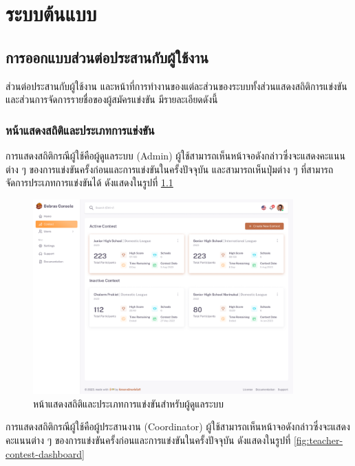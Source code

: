 \chapter{ระบบต้นแบบ}
\label{chapter:result}

\section{การออกแบบส่วนต่อประสานกับผู้ใช้งาน}

ส่วนต่อประสานกับผู้ใช้งาน และหน้าที่การทำงานของแต่ละส่วนของระบบทั้งส่วนแสดงสถิติการแข่งขันและส่วนการจัดการรายชื่อของผู้สมัครแข่งขัน มีรายละเอียดดังนี้

\subsection{หน้าแสดงสถิติและประเภทการแข่งขัน}

การแสดงสถิติกรณีผู้ใช้คือผู้ดูแลระบบ (Admin) ผู้ใช้สามารถเห็นหน้าจอดังกล่าวซึ่งจะแสดงคะแนนต่าง ๆ ของการแข่งขันครั้งก่อนและการแข่งขันในครั้งปัจจุบัน และสามารถเห็นปุ่มต่าง ๆ ที่สามารถจัดการประเภทการแข่งขันได้ ดังแสดงในรูปที่ \ref{fig:admin-contest-dashboard}

\begin{figure}[H]
    \centering
    \includegraphics[width=100mm,scale=1.0]{images/admin-contest-dashboard.png}
    \caption{หน้าแสดงสถิติและประเภทการแข่งขันสำหรับผู้ดูแลระบบ}
    \label{fig:admin-contest-dashboard}
\end{figure}

การแสดงสถิติกรณีผู้ใช้คือผู้ประสานงาน (Coordinator) ผู้ใช้สามารถเห็นหน้าจอดังกล่าวซึ่งจะแสดงคะแนนต่าง ๆ ของการแข่งขันครั้งก่อนและการแข่งขันในครั้งปัจจุบัน ดังแสดงในรูปที่ \ref{fig:teacher-contest-dashboard}

